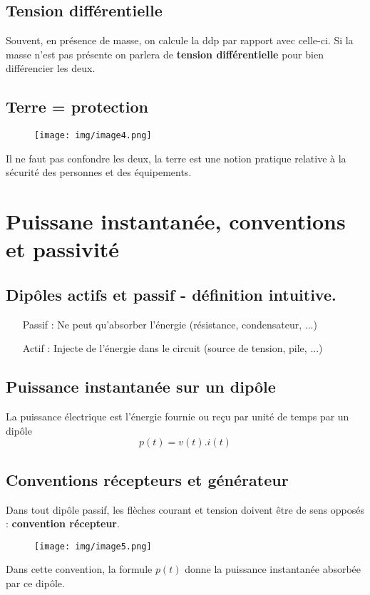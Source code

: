\documentclass	[11pt, a4paper, openany]{book}
\begin{document}
\subsection{Tension différentielle}
Souvent, en présence de masse, on calcule la ddp par rapport avec celle-ci. Si la masse n'est pas présente on parlera de \textbf{tension différentielle} pour bien différencier les deux.

\subsection{Terre = protection}
\begin{wrapfigure}[5]{r}{2.5cm}
\texttt{[image: img/image4.png]}
\end{wrapfigure}
Il ne faut pas confondre les deux, la terre est une notion pratique relative à la sécurité des personnes et des équipements.

\section{Puissane instantanée, conventions et passivité}
\subsection{Dipôles actifs et passif - définition intuitive.}
\begin{itemize}
\item[Passif] : Ne peut qu'absorber l'énergie (résistance, condensateur, ...)
\item[Actif] : Injecte de l'énergie dans le circuit (source de tension, pile, ...)
\end{itemize}

\subsection{Puissance instantanée sur un dipôle}
La puissance électrique est l'énergie fournie ou reçu par unité de temps par un dipôle
\begin{equation}
p(t) = v(t).i(t)
\end{equation}

\subsection{Conventions récepteurs et générateur}
Dans tout dipôle passif, les flèches courant et tension doivent être de sens opposés : \textbf{convention récepteur}.\\
\begin{wrapfigure}[8]{r}{3cm}
\texttt{[image: img/image5.png]}
\end{wrapfigure} Dans cette convention, la formule $p(t)$ donne la puissance instantanée absorbée par ce dipôle.
\end{document}
